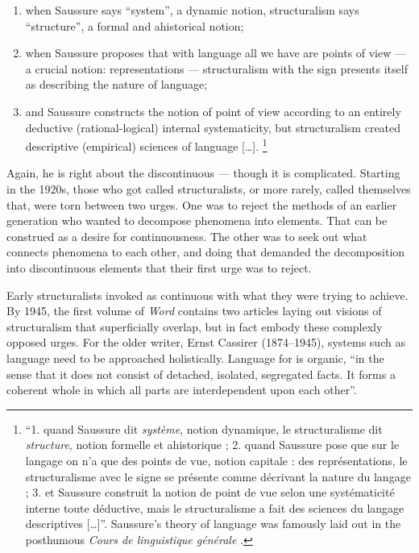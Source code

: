 \documentclass[output=paper]{langscibook}
\begin{document}
\begin{enumerate}
    \item when Saussure says ``system'', a dynamic notion, structuralism says ``structure'', a formal and ahistorical notion;
    \item when Saussure proposes that with language all we have are points of view — a crucial notion: representations — structuralism with the sign presents itself as describing the nature of language;
    \item and Saussure constructs the notion of point of view according to an entirely deductive (rational-logical) internal systematicity, but structuralism created descriptive (empirical) sciences of language […]. \linebreak\citep[20]{Meschonnic2009}\footnote{``1. quand Saussure dit \emph{système}, notion dynamique, le structuralisme dit \emph{structure}, notion formelle et ahistorique ; 2. quand Saussure pose que sur le langage on n'a que des points de vue, notion capitale : des représentations, le structuralisme avec le signe se présente comme décrivant la nature du langage ; 3. et Saussure construit la notion de point de vue selon une systématicité interne toute déductive, mais le structuralisme a fait des sciences du langage descriptives […]''. Saussure's theory of language was famously laid out in the posthumous \emph{Cours de linguistique générale} \citep{Saussure19221916}.}
\end{enumerate}

Again, he is right about the discontinuous — though it is complicated. Starting in the 1920s, those who got called structuralists, or more rarely, called themselves that, were torn between two urges. One was to reject the methods of an earlier generation who wanted to decompose phenomena into elements. That can be construed as a desire for continuousness. The other was to seek out what connects phenomena to each other, and doing that demanded the decomposition into discontinuous elements that their first urge was to reject.

Early structuralists invoked  as continuous with what they were trying to achieve. By 1945, the first volume of \emph{Word} contains two articles laying out visions of structuralism that superficially overlap, but in fact embody these complexly opposed urges. For the older writer, Ernst Cassirer (1874--1945), systems such as language need to be approached holistically. Language for \citet[110]{Cassirer1945} is organic, ``in the sense that it does not consist of detached, isolated, segregated facts. It forms a coherent whole in which all parts are interdependent upon each other''.
\end{document}
